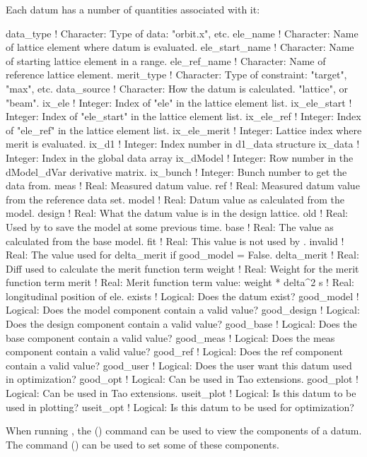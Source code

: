 Each datum has a number of quantities associated with it:
\begin{example}
  data_type        ! Character: Type of data: "orbit.x", etc.
  ele_name         ! Character: Name of lattice element where datum is evaluated.
  ele_start_name   ! Character: Name of starting lattice element in a range.
  ele_ref_name     ! Character: Name of reference lattice element.
  merit_type       ! Character: Type of constraint: "target", "max", etc.
  data_source      ! Character: How the datum is calculated. "lattice", or "beam".
  ix_ele           ! Integer: Index of "ele" in the lattice element list.
  ix_ele_start     ! Integer: Index of "ele_start" in the lattice element list.
  ix_ele_ref       ! Integer: Index of "ele_ref" in the lattice element list.
  ix_ele_merit     ! Integer: Lattice index where merit is evaluated.
  ix_d1            ! Integer: Index number in d1_data structure
  ix_data          ! Integer: Index in the global data array
  ix_dModel        ! Integer: Row number in the dModel_dVar derivative matrix.
  ix_bunch         ! Integer: Bunch number to get the data from.
  meas             ! Real: Measured datum value. 
  ref              ! Real: Measured datum value from the reference data set.
  model            ! Real: Datum value as calculated from the model.
  design           ! Real: What the datum value is in the design lattice.
  old              ! Real: Used by \tao to save the model at some previous time.
  base             ! Real: The value as calculated from the base model.
  fit              ! Real: This value is not used by \tao.
  invalid          ! Real: The value used for delta_merit if good_model = False.
  delta_merit      ! Real: Diff used to calculate the merit function term 
  weight           ! Real: Weight for the merit function term
  merit            ! Real: Merit function term value: weight * delta^2
  s                ! Real: longitudinal position of ele.
  exists           ! Logical: Does the datum exist?
  good_model       ! Logical: Does the model  component contain a valid value?
  good_design      ! Logical: Does the design component contain a valid value?
  good_base        ! Logical: Does the base   component contain a valid value?
  good_meas        ! Logical: Does the meas   component contain a valid value?
  good_ref         ! Logical: Does the ref    component contain a valid value?
  good_user        ! Logical: Does the user want this datum used in optimization?
  good_opt         ! Logical: Can be used in Tao extensions.
  good_plot        ! Logical: Can be used in Tao extensions.
  useit_plot       ! Logical: Is this datum to be used in plotting?
  useit_opt        ! Logical: Is this datum to be used for optimization?
\end{example}
When running \tao, the 
() command can be used to view the components of a datum. 
The  command () can be used to set some of these components.

